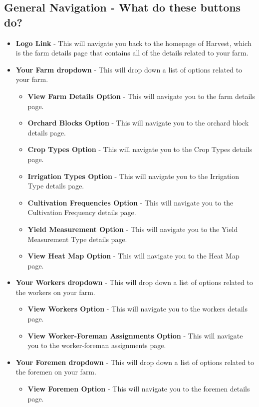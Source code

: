 \documentclass[11pt,fleqn]{book} %
\begin{document}
		\subsection{General Navigation - What do these buttons do?}
		\begin{itemize}
			\item \textbf{Logo Link} - This will navigate you back to the homepage of Harvest, which is the farm details page that contains all of the details related to your farm.
			\item \textbf{Your Farm dropdown} - This will drop down a list of options related to your farm.
			\begin{itemize}
				\item \textbf{View Farm Details Option} - This will navigate you to the farm details page.
				\item \textbf{Orchard Blocks Option} - This will navigate you to the orchard block details page.
				\item \textbf{Crop Types Option} - This will navigate you to the Crop Types details page.
				\item \textbf{Irrigation Types Option} - This will navigate you to the Irrigation Type details page.
				\item \textbf{Cultivation Frequencies Option} - This will navigate you to the Cultivation Frequency details page.
				\item \textbf{Yield Measurement Option} - This will navigate you to the Yield Measurement Type details page.
				\item \textbf{View Heat Map Option} - This will navigate you to the Heat Map page.
			\end{itemize}
			\item \textbf{Your Workers dropdown} - This will drop down a list of options related to the workers on your farm.
			\begin{itemize}
				\item \textbf{View Workers Option} - This will navigate you to the workers details page.
				\item \textbf{View Worker-Foreman Assignments Option} - This will navigate you to the worker-foreman assignments page.
			\end{itemize}
			\item \textbf{Your Foremen dropdown} - This will drop down a list of options related to the foremen on your farm.
			\begin{itemize}
				\item \textbf{View Foremen Option} - This will navigate you to the foremen details page.

\end{itemize}
\end{itemize}
\end{document}
